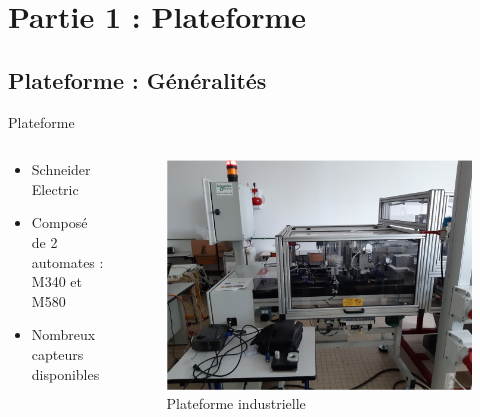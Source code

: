 \section{Partie 1 : Plateforme}
    \subsection{Plateforme : Généralités}
        \begin{frame}[allowframebreaks]{Plateforme}
            \begin{columns}
                \begin{column}{0.5\textwidth}
                    \begin{exampleblock}{}
                        \begin{itemize}
                            \item Schneider Electric
                            \item Composé de 2 automates : M340 et M580
                            \item Nombreux capteurs disponibles
                        \end{itemize}
                    \end{exampleblock}
                \end{column}\hfill
                \begin{column}{0.5\textwidth}
                    \begin{figure}
                        \includegraphics[width=1\linewidth]{images/plateforme.jpg}
                        \caption*{Plateforme industrielle}
                    \end{figure}
                \end{column}
            \end{columns}
        \end{frame}
%
